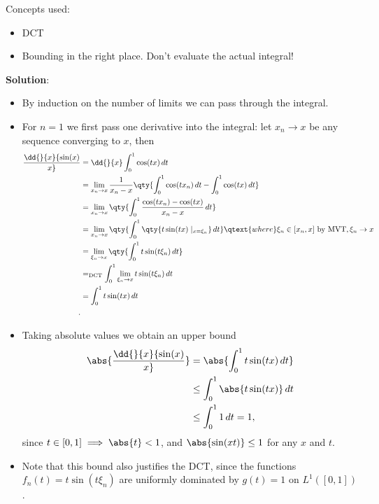 \begin{solution}

Concepts used:

\begin{itemize}
\tightlist
\item
  DCT
\item
  Bounding in the right place. Don't evaluate the actual integral!
\end{itemize}

\textbf{Solution}:

\begin{itemize}
\item
  By induction on the number of limits we can pass through the integral.
\item
  For \(n=1\) we first pass one derivative into the integral: let
  \(x_n \to x\) be any sequence converging to \(x\), then
  \begin{align*}
  \dd{}{x} {\sin(x) \over x} 
  &= \dd{}{x} \int_0^1 \cos(tx)\,dt  \\
  &= \lim_{x_n\to x} {1\over x_n - x} \qty{ \int_0^1 \cos(t x_n)\,dt  - \int_0^1 \cos(tx) \,dt} \\
  &= \lim_{x_n\to x} \qty{ \int_0^1 { \cos(tx_n)  - \cos(tx) \over x_n - x}   \,dt} \\
  &= \lim_{x_n\to x} \qty{ \int_0^1 \qty{t\sin(tx)\mid_{x=\xi_n}}  \,dt} \qtext{where} \xi_n \in [x_n, x] \text{ by MVT}, \xi_n\to x \\
  &= \lim_{\xi_n\to x} \qty{ \int_0^1 t \sin(t \xi_n)  \,dt}  \\
  &=_{\text{DCT}}  \int_0^1 \lim_{\xi_n \to x} t \sin(t \xi_n)  \,dt \\
  &= \int_0^1 t\sin(tx) \,dt \\
  .\end{align*}
\item
  Taking absolute values we obtain an upper bound
  \begin{align*}
  \abs{ \dd{}{x} {\sin(x) \over x} } 
  &= \abs{ \int_0^1 t\sin(tx) \,dt } \\
  &\leq \int_0^1 \abs{t\sin(tx)} \,dt \\
  &\leq \int_0^1 1 \, dt = 1
  ,\end{align*} since \(t\in [0, 1] \implies \abs{t} < 1\), and
  \(\abs{\sin(xt)} \leq 1\) for any \(x\) and \(t\).
\item
  Note that this bound also justifies the DCT, since the functions
  \(f_n(t) = t\sin(t \xi_n )\) are uniformly dominated by \(g(t) = 1\)
  on \(L^1([0, 1])\).
\end{itemize}


\end{solution}
